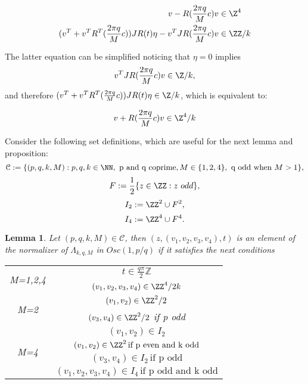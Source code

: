 \documentclass[12pt]{amsart}
\theoremstyle{plain}
\newtheorem{lem}[thm]{Lemma}
\theoremstyle{definition}
\theoremstyle{remark}
\begin{document}
\begin{align}
    v - R(\frac{2 \pi q}{M}c) v &\in \Z^4  \label{ccc1} \\
    (v^T + v^T R^T(\frac{2 \pi q}{M}c)) J R(t) \eta - v^T J R(\frac{2 \pi q}{M}c) v  &\in \ZZ/{k} \nonumber
\end{align}

The latter equation can be simplified noticing that $\eta = 0$ implies 
\begin{equation}
    v^T J R(\frac{2 \pi q}{M}c)v \in \Z/k, \label{ccc2}
\end{equation}
and therefore $(v^T + v^T R^T(\frac{2 \pi q}{M}c)) J R(t) \eta \in \Z / k$, 
which is equivalent to:

\begin{equation}
    v + R(\frac{2 \pi q}{M}c) v \in \Z^4 / k \label{ccc3}
\end{equation}

Consider the following set definitions, which are useful for the next lemma and proposition:
$$\mathcal{C} := \{ (p,q,k,M): p,q,k \in \NN, \mbox{ p and q coprime}, M \in \{ 1,2,4\}, \mbox{ q odd when $M > 1$} \},$$
$$F := \frac{1}{2}\{ z \in \ZZ : z \,\, odd \},$$
$$I_2 := \ZZ^2 \cup F^2,$$
$$I_4 := \ZZ^4 \cup F^4.$$



\begin{lem}
     Let $(p,q,k,M) \in \mathcal{C}$, then $(z, (v_1,v_2,v_3,v_4),t)$ is an element of the normalizer of $\Lambda_{k,q,M}$ in $Osc(1,p/q)$ if it satisfies the next conditions

    \def\arraystretch{1.5}
    \begin{center}
    \begin{tabular}{|c|c|}\hline
    \multirow{2}{*}{M=1,2,4} & $t \in \frac{q \pi}{2} \mathbb{Z}$   \\\cline{2-2}
        & $(v_1,v_2,v_3,v_4) \in \ZZ^4 / {2 k}$  \\\hline
    \multirow{2}{*}{M=2} & $(v_1,v_2) \in \ZZ^2/2$  \\\cline{2-2}
        & $(v_3,v_4) \in \ZZ^2/2$ if p odd   \\\hline
    \multirow{4}{*}{M=4} & $(v_1,v_2) \in I_2$  \\\cline{2-2}
        & $(v_1,v_2) \in \ZZ^2 \, \text{if p even and k odd}$  \\\cline{2-2}
        & $(v_3,v_4) \in I_2 \, \text{if p odd}$  \\\cline{2-2}
        & $(v_1,v_2,v_3,v_4) \in I_4 \, \text{if p odd and k odd}$  \\\hline
    \end{tabular}
    \end{center}
    
\end{lem}
\end{document}
